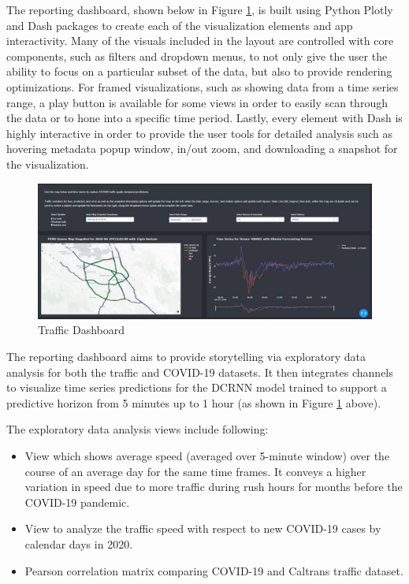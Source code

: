 \documentclass{article}
\begin{document}
The reporting dashboard, shown below in Figure \ref{fig:dashboard}, is built using Python Plotly and Dash packages to create each of the visualization elements and app interactivity. Many of the visuals included in the layout are controlled with core components, such as filters and dropdown menus, to not only give the user the ability to focus on a particular subset of the data, but also to provide rendering optimizations. For framed visualizations, such as showing data from a time series range, a play button is available for some views in order to easily scan through the data or to hone into a specific time period. Lastly, every element with Dash is highly interactive in order to provide the user tools for detailed analysis such as hovering metadata popup window, in/out zoom, and downloading a snapshot for the visualization.

\begin{figure}[hbt!]
	\centering
	\includegraphics[width=\textwidth]{images/dashboard.jpeg}
	\caption{Traffic Dashboard}
	\label{fig:dashboard}
\end{figure}

The reporting dashboard aims to provide storytelling via exploratory data analysis for both the traffic and COVID-19 datasets. It then integrates channels to visualize time series predictions for the DCRNN model trained to support a predictive horizon from 5 minutes up to 1 hour (as shown in Figure \ref{fig:dashboard} above).

The exploratory data analysis views include following:
\begin{itemize}
    \item View which shows average speed (averaged over 5-minute window) over the course of an average day for the same time frames. It conveys a higher variation in speed due to more traffic during rush hours for months before the COVID-19 pandemic.
    \item View to analyze the traffic speed with respect to new COVID-19 cases by calendar days in 2020.
    \item Pearson correlation matrix comparing COVID-19 and Caltrans traffic dataset.
\end{itemize}
\end{document}
